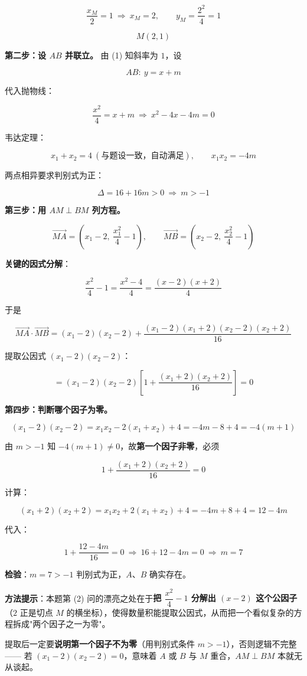 \[\frac{x_M}2=1\ \Longrightarrow\ x_M=2,\qquad y_M=\frac{2^{2}}4=1\]

\[M(2,1)\]

\textbf{第二步：设 $AB$ 并联立。} 由 (1) 知斜率为 $1$，设

\[AB:\ y=x+m\]

代入抛物线：

\[\frac{x^{2}}4=x+m\ \Longrightarrow\ x^{2}-4x-4m=0\]

韦达定理：

\[x_1+x_2=4\ (\text{与题设一致，自动满足}),\qquad x_1x_2=-4m\]

两点相异要求判别式为正：

\[\Delta=16+16m>0\ \Longrightarrow\ m>-1\]

\textbf{第三步：用 $AM\perp BM$ 列方程。}

\[\overrightarrow{MA}=\left(x_1-2,\ \frac{x_1^{2}}4-1\right),\qquad \overrightarrow{MB}=\left(x_2-2,\ \frac{x_2^{2}}4-1\right)\]

\textbf{关键的因式分解}：

\[\frac{x^{2}}4-1=\frac{x^{2}-4}4=\frac{(x-2)(x+2)}4\]

于是

\[\overrightarrow{MA}\cdot\overrightarrow{MB}=\left(x_1-2\right)\left(x_2-2\right)+\frac{\left(x_1-2\right)\left(x_1+2\right)\left(x_2-2\right)\left(x_2+2\right)}{16}\]

提取公因式 $\left(x_1-2\right)\left(x_2-2\right)$：

\[=\left(x_1-2\right)\left(x_2-2\right)\left[1+\frac{\left(x_1+2\right)\left(x_2+2\right)}{16}\right]=0\]

\textbf{第四步：判断哪个因子为零。}

\[\left(x_1-2\right)\left(x_2-2\right)=x_1x_2-2\left(x_1+x_2\right)+4=-4m-8+4=-4(m+1)\]

由 $m>-1$ 知 $-4(m+1)\ne0$，故\textbf{第一个因子非零}，必须

\[1+\frac{\left(x_1+2\right)\left(x_2+2\right)}{16}=0\]

计算：

\[\left(x_1+2\right)\left(x_2+2\right)=x_1x_2+2\left(x_1+x_2\right)+4=-4m+8+4=12-4m\]

代入：

\[1+\frac{12-4m}{16}=0\ \Longrightarrow\ 16+12-4m=0\ \Longrightarrow\ m=7\]

\textbf{检验}：$m=7>-1$  判别式为正，$A$、$B$ 确实存在。


\begin{gktip}
\textbf{方法提示}：本题第 (2) 问的漂亮之处在于\textbf{把 $\dfrac{x^{2}}4-1$ 分解出 $(x-2)$ 这个公因子}（$2$ 正是切点 $M$ 的横坐标），使得数量积能提取公因式，从而把一个看似复杂的方程拆成"两个因子之一为零"。

提取后一定要\textbf{说明第一个因子不为零}（用判别式条件 $m>-1$），否则逻辑不完整 —— 若 $\left(x_1-2\right)\left(x_2-2\right)=0$，意味着 $A$ 或 $B$ 与 $M$ 重合，$AM\perp BM$ 本就无从谈起。
\end{gktip}

